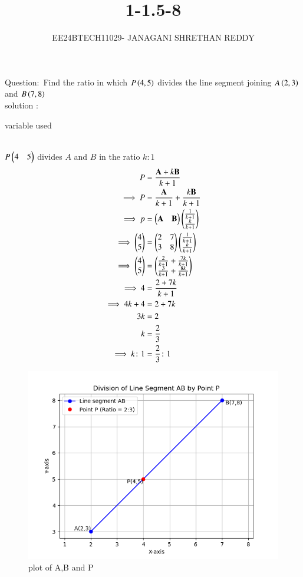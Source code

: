 \documentclass[journal]{IEEEtran}
\begin{document}
 


\vspace{3cm}

\title{1-1.5-8}
\author{EE24BTECH11029- JANAGANI SHRETHAN REDDY}
\maketitle
\bigskip
\renewcommand{\thefigure}{\theenumi}
\renewcommand{\thetable}{\theenumi}

Question$\colon$
     Find the ratio in which $P\left(4,5\right)$ divides the line segment joining $A\left(2,3\right)$ and $B\left(7,8\right)$\\

solution $\colon$
\begin{table}[h!]
 \centering
 
 \caption{variable used}
\end{table}\\
 $P\begin{pmatrix}4&5\end{pmatrix}$ divides $A$ and $B$ in the ratio $k\colon1$
\begin{align}
    P&=\frac{\vec{A}+k\vec{B}}{k+1}\\
\implies P&=\frac{\vec{A}}{k+1}+\frac{k\vec{B}}{k+1}\\
\implies p&=\myvec{\Vec{A}&\Vec{B}}\myvec{\frac{1}{k+1}\\\frac{k}{k+1}}\\
\implies \myvec{4\\5}&=\myvec{2&7\\3&8}\myvec{\frac{1}{k+1}\\\frac{k}{k+1}}\\
\implies \myvec{4\\5}&=\myvec{\frac{2}{k+1}+\frac{7k}{k+1}\\\frac{3}{k+1}+\frac{8k}{k+1}}\\
\implies 4&=\frac{2+7k}{k+1}\\
\implies 4k+4&=2+7k\\
3k&=2\\
k&=\frac{2}{3}\\
\implies k\colon1&=\frac{2}{3}\colon1\\
 \end{align}
 \begin{figure}[h!]
  \centering
  \includegraphics[width=1\linewidth]{fig.png}
  \caption{plot of A,B and P}
 \end{figure}
 
\end{document}

